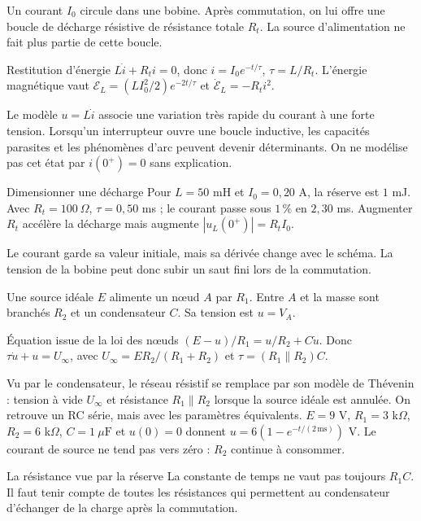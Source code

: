 Un courant $I_0$ circule dans une bobine. Après commutation, on lui offre une boucle de décharge résistive de résistance totale $R_t$. La source d’alimentation ne fait plus partie de cette boucle.
\begin{loi}{Restitution d’énergie}
$L\dot i+R_ti=0$, donc $i=I_0e^{-t/\tau}$, $\tau=L/R_t$. L’énergie magnétique vaut $\mathcal E_L=(LI_0^2/2)e^{-2t/\tau}$ et $\dot{\mathcal E}_L=-R_ti^2$.
\end{loi}
Le modèle $u=L\dot i$ associe une variation très rapide du courant à une forte tension. Lorsqu’un interrupteur ouvre une boucle inductive, les capacités parasites et les phénomènes d’arc peuvent devenir déterminants. On ne modélise pas cet état par $i(0^+)=0$ sans explication.
\begin{methode}{Dimensionner une décharge}
Pour $L=50$ mH et $I_0=0{,}20$ A, la réserve est $1$ mJ. Avec $R_t=100\ \Omega$, $\tau=0{,}50$ ms ; le courant passe sous $1\,\%$ en $2{,}30$ ms. Augmenter $R_t$ accélère la décharge mais augmente $|u_L(0^+)|=R_tI_0$.
\end{methode}
Le courant garde sa valeur initiale, mais sa dérivée change avec le schéma. La tension de la bobine peut donc subir un saut fini lors de la commutation.


Une source idéale $E$ alimente un nœud $A$ par $R_1$. Entre $A$ et la masse sont branchés $R_2$ et un condensateur $C$. Sa tension est $u=V_A$.
\begin{loi}{Équation issue de la loi des nœuds}
$(E-u)/R_1=u/R_2+C\dot u$. Donc $\tau\dot u+u=U_\infty$, avec $U_\infty=ER_2/(R_1+R_2)$ et $\tau=(R_1\parallel R_2)C$.
\end{loi}
Vu par le condensateur, le réseau résistif se remplace par son modèle de Thévenin : tension à vide $U_\infty$ et résistance $R_1\parallel R_2$ lorsque la source idéale est annulée. On retrouve un RC série, mais avec les paramètres équivalents.
$E=9$ V, $R_1=3$ k$\Omega$, $R_2=6$ k$\Omega$, $C=1\ \mu\mathrm{ F}$ et $u(0)=0$ donnent $u=6(1-e^{-t/(2\,\mathrm{ms})})$ V. Le courant de source ne tend pas vers zéro : $R_2$ continue à consommer.
\begin{piege}{La résistance vue par la réserve}
La constante de temps ne vaut pas toujours $R_1C$. Il faut tenir compte de toutes les résistances qui permettent au condensateur d’échanger de la charge après la commutation.
\end{piege}


